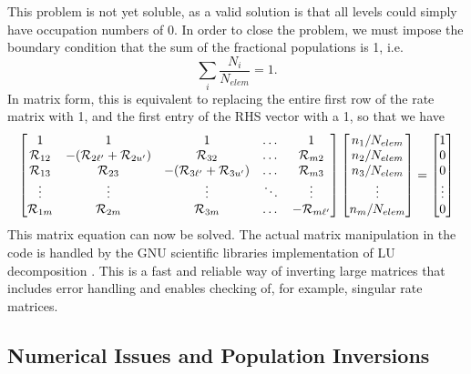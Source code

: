 %
This problem is not yet soluble, as a valid solution is that all levels 
could simply have occupation numbers of $0$. In order to close the problem, we must impose the boundary condition that the sum of the fractional populations is 1, i.e.
%
\begin{equation}
\sum_i \frac{N_i}{N_{elem}} = 1.
\end{equation}
In matrix form, this is equivalent to replacing the entire first row
of the rate matrix with 1, and the first entry of the RHS vector with a 1,
so that we have
%
\begin{equation}
\begin{bmatrix}
    1  & 1 & 1 & \dots & 1\\
    {\cal R}_{12} & -({\cal R}_{2{\ell^\prime}} + {\cal R}_{2{u^\prime}}) & {\cal R}_{32} & \dots & {\cal R}_{m2} \\
    {\cal R}_{13}  & {\cal R}_{23} & -({\cal R}_{3{\ell^\prime}} + {\cal R}_{3{u^\prime}}) & \dots & {\cal R}_{m3} \\
    \vdots & \vdots & \vdots & \ddots & \vdots \\
    {\cal R}_{1m}      & {\cal R}_{2m} & {\cal R}_{3m} & \dots & -{\cal R}_{m{\ell^\prime}}
\end{bmatrix}
\begin{bmatrix}
    n_1 / N_{elem} \\
    n_2 / N_{elem} \\
    n_3 / N_{elem} \\
    \vdots         \\
    n_m / N_{elem} 
\end{bmatrix}
=
\begin{bmatrix}
    1 \\
    0 \\
    0 \\
    \vdots \\
    0
\end{bmatrix}
\end{equation}
%
This matrix equation can now be solved.
The actual matrix manipulation in the code is handled by the GNU 
scientific libraries \citep[GSL;][]{GSL} implementation of
LU decomposition \citep{turing}. This is a fast and reliable way of
inverting large matrices that includes error handling and enables
checking of, for example, singular rate matrices.

\subsection{Numerical Issues and Population Inversions}
\label{sec:numerical_matom}

